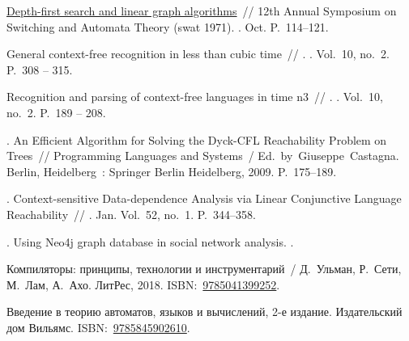 \begin{thebibliography}{10}
 \href{http://dx.doi.org/10.1109/SWAT.1971.10}{Depth-first
  search and linear graph algorithms}~// 12th Annual Symposium on Switching and
  Automata Theory (swat 1971). \BibDash
{}. \BibDash Oct. \BibDash
\newblock P.~114--121.

 General context-free recognition in less than cubic
  time~//
  \href{http://dx.doi.org/10.1016/S0022-0000(75)80046-8}{}. \BibDash
{}. \BibDash
\newblock Vol.~10, no.~2. \BibDash
\newblock P.~308 -- 315.

 Recognition and parsing of context-free languages
  in time n3~//
  \href{http://dx.doi.org/10.1016/S0019-9958(67)80007-X}{}. \BibDash
{}. \BibDash
\newblock Vol.~10, no.~2. \BibDash
\newblock P.~189 -- 208.

. An Efficient Algorithm for Solving the
  Dyck-CFL Reachability Problem on Trees~// Programming Languages and Systems~/
  Ed.\ by\ Giuseppe~Castagna. \BibDash
\newblock Berlin, Heidelberg~: Springer Berlin Heidelberg, 2009. \BibDash
\newblock P.~175--189.

. Context-sensitive Data-dependence Analysis
  via Linear Conjunctive Language Reachability~//
  \href{http://dx.doi.org/10.1145/3093333.3009848}{}
  \BibDash
{}. \BibDash Jan. \BibDash
\newblock Vol.~52, no.~1. \BibDash
\newblock P.~344--358.

. Using Neo4j graph database in social network
  analysis. \BibDash
{}.

Компиляторы: принципы, технологии и
  инструментарий~/ Д.~Ульман, Р.~Сети, М.~Лам,
  А.~Ахо. \BibDash
\newblock ЛитРес, 2018. \BibDash
\newblock
  ISBN:~\href{http://isbndb.com/search-all.html?kw=9785041399252}{9785041399252}.

  Введение в теорию автоматов, языков и
  вычислений, 2-е издание. \BibDash
\newblock Издательский дом Вильямс. \BibDash
\newblock
  ISBN:~\href{http://isbndb.com/search-all.html?kw=9785845902610}{9785845902610}.

\end{thebibliography}

